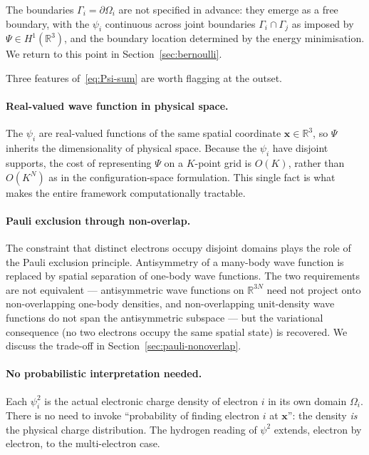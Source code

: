 The boundaries $\Gamma_i = \partial \Omega_i$ are not specified in advance: they emerge as a free boundary, with the $\psi_i$ continuous across joint boundaries $\Gamma_i \cap \Gamma_j$ as imposed by $\Psi \in H^1(\mathbb{R}^3)$, and the boundary location determined by the energy minimisation. We return to this point in Section~\ref{sec:bernoulli}.

Three features of~\eqref{eq:Psi-sum} are worth flagging at the outset.

\paragraph{Real-valued wave function in physical space.} The $\psi_i$ are real-valued functions of the same spatial coordinate $\mathbf{x} \in \mathbb{R}^3$, so $\Psi$ inherits the dimensionality of physical space. Because the $\psi_i$ have disjoint supports, the cost of representing $\Psi$ on a $K$-point grid is $O(K)$, rather than $O(K^N)$ as in the configuration-space formulation. This single fact is what makes the entire framework computationally tractable.

\paragraph{Pauli exclusion through non-overlap.} The constraint that distinct electrons occupy disjoint domains plays the role of the Pauli exclusion principle. Antisymmetry of a many-body wave function is replaced by spatial separation of one-body wave functions. The two requirements are not equivalent --- antisymmetric wave functions on $\mathbb{R}^{3N}$ need not project onto non-overlapping one-body densities, and non-overlapping unit-density wave functions do not span the antisymmetric subspace --- but the variational consequence (no two electrons occupy the same spatial state) is recovered. We discuss the trade-off in Section~\ref{sec:pauli-nonoverlap}.

\paragraph{No probabilistic interpretation needed.} Each $\psi_i^2$ is the actual electronic charge density of electron $i$ in its own domain $\Omega_i$. There is no need to invoke ``probability of finding electron $i$ at $\mathbf{x}$'': the density \emph{is} the physical charge distribution. The hydrogen reading of $\psi^2$ extends, electron by electron, to the multi-electron case.

